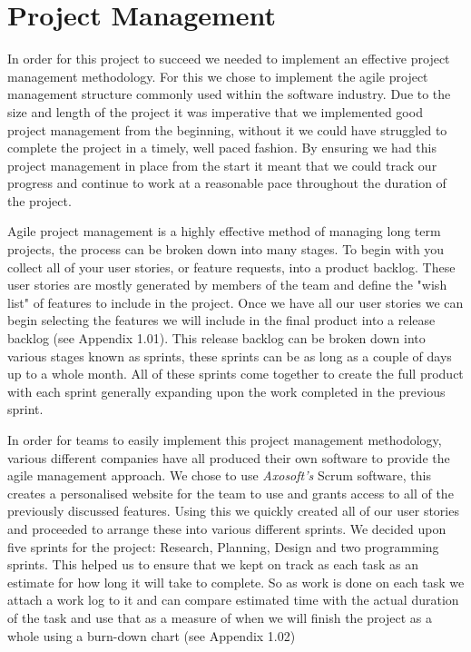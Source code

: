 \documentclass[a4paper]{report}
\begin{document}
\chapter{Project Management}
In order for this project to succeed we needed to implement an effective project management methodology. For this we chose to implement the agile project management structure commonly used within the software industry. Due to the size and length of the project it was imperative that we implemented good project management from the beginning, without it we could have struggled to complete the project in a timely, well paced fashion. By ensuring we had this project management in place from the start it meant that we could track our progress and continue to work at a reasonable pace throughout the duration of the project.

Agile project management is a highly effective method of managing long term projects, the process can be broken down into many stages. To begin with you collect all of your user stories, or feature requests, into a product backlog. These user stories are mostly generated by members of the team and define the "wish list" of features to include in the project. Once we have all our user stories we can begin selecting the features we will include in the final product into a release backlog (see Appendix 1.01). This release backlog can be broken down into various stages known as sprints, these sprints can be as long as a couple of days up to a whole month. All of these sprints come together to create the full product with each sprint generally expanding upon the work completed in the previous sprint.

In order for teams to easily implement this project management methodology, various different companies have all produced their own software to provide the agile management approach. We chose to use \textit{Axosoft's} Scrum software, this creates a personalised website for the team to use and grants access to all of the previously discussed features. Using this we quickly created all of our user stories and proceeded to arrange these into various different sprints. We decided upon five sprints for the project: Research, Planning, Design and two programming sprints. This helped us to ensure that we kept on track as each task as an estimate for how long it will take to complete. So as work is done on each task we attach a work log to it and can compare estimated time with the actual duration of the task and use that as a measure of when we will finish the project as a whole using a burn-down chart (see Appendix 1.02)
\end{document}
